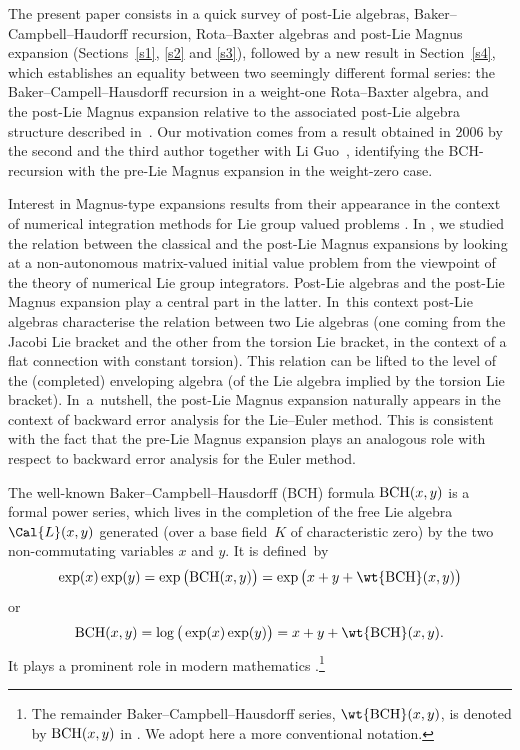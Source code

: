 \documentclass[pdftex]{sigma}
\numberwithin{equation}{section}
\begin{document}
The present paper consists in a quick survey of post-Lie algebras, Baker--Campbell--Haudorff recursion, Rota--Baxter algebras and post-Lie Magnus expansion (Sections~\ref{s1}, \ref{s2} and \ref{s3}), followed by a new result in Section~\ref{s4}, which establishes an equality between two seemingly different formal series: the Baker--Campell--Hausdorff recursion in a weight-one Rota--Baxter algebra, and the post-Lie Magnus expansion relative to the associated post-Lie algebra structure described in~\cite{BGN10}. Our motivation comes from a result obtained in 2006 by the second and the third author together with Li Guo~\cite{KLM06}, identifying the BCH-recursion with the pre-Lie Magnus expansion in the weight-zero case.

Interest in Magnus-type expansions results from their appearance in the context of numerical integration methods for Lie group valued problems \cite{IserlesNorsett99}. In \cite{CEO20}, we studied the relation between the classical and the post-Lie Magnus expansions by looking at a non-autonomous matrix-valued initial value problem from the viewpoint of the theory of numerical Lie group integrators. Post-Lie algebras and the post-Lie Magnus expansion play a central part in the latter. In~this context post-Lie algebras characterise the relation between two Lie algebras (one coming from the Jacobi Lie bracket and the other from the torsion Lie bracket, in the context of a flat connection with constant torsion). This relation can be lifted to the level of the (completed) enveloping algebra (of the Lie algebra implied by the torsion Lie bracket). In~a~nut\-shell, the post-Lie Magnus expansion naturally appears in the context of backward error analysis for the Lie--Euler method. This is consistent with the fact that the pre-Lie Magnus expansion plays an analogous role with respect to backward error analysis for the Euler method.

The well-known Baker--Campbell--Hausdorff (BCH) formula ${\rm BCH}(x, y)$ is a formal power series, which lives in the completion of the free Lie algebra $\Cal{L}(x, y)$ generated (over a base field~$K$ of characteristic zero) by the two non-commutating variables $x$ and $y$. It is defined~by
\begin{displaymath}
\exp(x)\exp(y)= \exp\big( {\rm BCH}(x, y)\big)= \exp\big( x + y+ \wt{{\rm BCH}}(x, y)\big)
\end{displaymath}
or
\begin{displaymath}
{\rm BCH}(x, y)=\log\big( \exp(x)\exp(y)\big)= x + y + \wt{{\rm BCH}}(x, y).
\end{displaymath}
It plays a prominent role in modern mathematics \cite{AAFCCC020,BF12}.\footnote{The remainder Baker--Campbell--Hausdorff series, $\wt{{\rm BCH}}(x,y)$, is denoted by ${\rm BCH}(x,y)$ in \cite{KLM06}. We adopt here a more conventional notation.}
\end{document}
